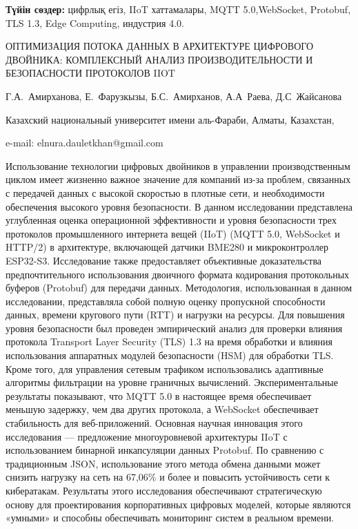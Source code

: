 {\bfseries Түйін сөздер:} цифрлық егіз, IIoT хаттамалары, MQTT
5.0,WebSocket, Protobuf, TLS 1.3, Edge Computing, индустрия 4.0.

\begin{header}
ОПТИМИЗАЦИЯ ПОТОКА ДАННЫХ В АРХИТЕКТУРЕ ЦИФРОВОГО ДВОЙНИКА: КОМПЛЕКСНЫЙ АНАЛИЗ ПРОИЗВОДИТЕЛЬНОСТИ И БЕЗОПАСНОСТИ ПРОТОКОЛОВ IIOT

Г.А.~Амирханова,
Е.~Фарузкызы\envelope,
Б.С.~Амирханов,
А.А~Раева,
Д.С~Жайсанова
\end{header}

\begin{affil}
Казахский национальный университет имени аль-Фараби, Алматы, Казахстан,

e-mail: elnura.dauletkhan@gmail.com
\end{affil}

Использование технологии цифровых двойников в управлении
производственным циклом имеет жизненно важное значение для компаний
из-за проблем, связанных с передачей данных с высокой скоростью в
плотные сети, и необходимости обеспечения высокого уровня безопасности.
В данном исследовании представлена углубленная
оценка операционной эффективности и уровня безопасности трех протоколов
промышленного интернета вещей (IIoT) (MQTT 5.0, WebSocket и HTTP/2) в
архитектуре, включающей датчики BME280 и микроконтроллер ESP32-S3.
Исследование также предоставляет объективные доказательства
предпочтительного использования двоичного формата кодирования
протокольных буферов (Protobuf) для передачи данных. Методология,
использованная в данном исследовании, представляла собой полную оценку
пропускной способности данных, времени кругового пути (RTT) и нагрузки
на ресурсы. Для повышения уровня безопасности был проведен эмпирический
анализ для проверки влияния протокола Transport Layer Security (TLS) 1.3
на время обработки и влияния использования аппаратных модулей
безопасности (HSM) для обработки TLS. Кроме того, для управления сетевым
трафиком использовались адаптивные алгоритмы фильтрации на уровне
граничных вычислений. Экспериментальные результаты показывают, что MQTT
5.0 в настоящее время обеспечивает меньшую задержку, чем два других
протокола, а WebSocket обеспечивает стабильность для веб-приложений.
Основная научная инновация этого исследования --- предложение
многоуровневой архитектуры IIoT с использованием бинарной инкапсуляции
данных Protobuf. По сравнению с традиционным JSON, использование этого
метода обмена данными может снизить нагрузку на сеть на 67,06\% и более
и повысить устойчивость сети к кибератакам. Результаты этого
исследования обеспечивают стратегическую основу для проектирования
корпоративных цифровых моделей, которые являются «умными» и способны
обеспечивать мониторинг систем в реальном времени.

